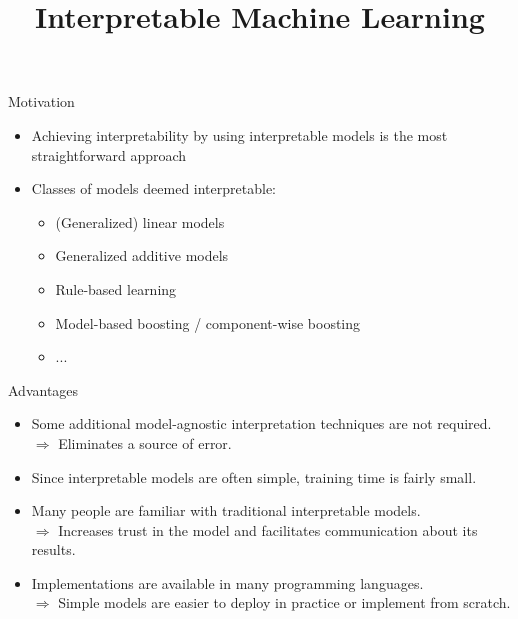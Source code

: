 \documentclass[11pt,compress,t,notes=noshow, aspectratio=169, xcolor=table]{beamer}
\title{Interpretable Machine Learning}
\date{}
\begin{document}
\newcommand{\titlefigure}{figure/whitebox}
\newcommand{\learninggoals}{
\item What characteristics does an interpretable model have?
\item Why should we use interpretable models at all?
\item Examples for interpretable models.}


\begin{frame}{Motivation}

    \begin{itemize}
        \item Achieving interpretability by using interpretable models is the most straightforward approach
        \bigskip
        \item Classes of models deemed interpretable:
        \begin{itemize}
            \item (Generalized) linear models
            \item Generalized additive models
            \item Rule-based learning
            \item Model-based boosting / component-wise boosting
            \item ...
        \end{itemize}
    \end{itemize}

\end{frame}

\begin{frame}{Advantages}

    \begin{itemize}
    \itemsep1em
        \item Some additional model-agnostic interpretation techniques are not required.\\
        $\Rightarrow$ Eliminates a source of error.
        \item Since interpretable models are often simple, training time is fairly small.
        \item Many people are familiar with traditional interpretable models.\\
        $\Rightarrow$ Increases trust in the model and facilitates communication about its results.
        \item Implementations are available in many programming languages. \\
        $\Rightarrow$ Simple models are easier to deploy in practice or implement from scratch.
    \end{itemize}

\end{frame}
\end{document}
